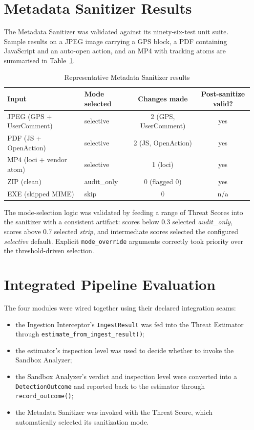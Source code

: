 \documentclass[12pt, a4paper]{report}
\begin{document}
\section{Metadata Sanitizer Results}

The Metadata Sanitizer was validated against its ninety-six-test unit
suite. Sample results on a JPEG image carrying a GPS block, a PDF
containing JavaScript and an auto-open action, and an MP4 with
tracking atoms are summarised in Table~\ref{tab:ms_results}.

\begin{table}[H]
\centering
\caption{Representative Metadata Sanitizer results}
\label{tab:ms_results}
\begin{tabular}{|l|l|c|c|}
\hline
\textbf{Input} & \textbf{Mode selected} & \textbf{Changes made} & \textbf{Post-sanitize valid?} \\
\hline
JPEG (GPS + UserComment) & selective & 2 (GPS, UserComment) & yes \\
\hline
PDF (JS + OpenAction) & selective & 2 (JS, OpenAction) & yes \\
\hline
MP4 (loci + vendor atom) & selective & 1 (loci) & yes \\
\hline
ZIP (clean) & audit\_only & 0 (flagged 0) & yes \\
\hline
EXE (skipped MIME) & skip & 0 & n/a \\
\hline
\end{tabular}
\end{table}

The mode-selection logic was validated by feeding a range of Threat
Scores into the sanitizer with a consistent artifact: scores below 0.3
selected \emph{audit\_only}, scores above 0.7 selected \emph{strip},
and intermediate scores selected the configured \emph{selective}
default. Explicit \texttt{mode\_override} arguments correctly took
priority over the threshold-driven selection.

\section{Integrated Pipeline Evaluation}

The four modules were wired together using their declared integration
seams:
\begin{itemize}
    \item the Ingestion Interceptor's \texttt{IngestResult} was fed
          into the Threat Estimator through
          \texttt{estimate\_from\_ingest\_result()};
    \item the estimator's inspection level was used to decide whether
          to invoke the Sandbox Analyzer;
    \item the Sandbox Analyzer's verdict and inspection level were
          converted into a \texttt{DetectionOutcome} and reported back
          to the estimator through \texttt{record\_outcome()};
    \item the Metadata Sanitizer was invoked with the Threat Score,
          which automatically selected its sanitization mode.
\end{itemize}
\end{document}
